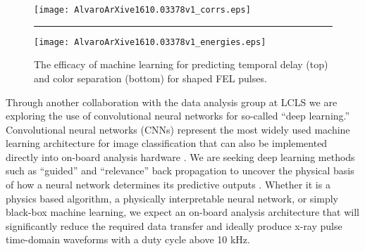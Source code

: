 \begin{wrapfigure}[27]{r}{.5\linewidth}
\vspace{-1\baselineskip}
\centerline{
\texttt{[image: AlvaroArXive1610.03378v1\_corrs.eps]}
}
\hrule
\centerline{
\texttt{[image: AlvaroArXive1610.03378v1\_energies.eps]}
}
\vspace{-2\baselineskip}
\caption{\label{AlvaroIdea} The efficacy of machine learning for predicting temporal delay (top) and color separation (bottom) for shaped FEL pulses. \cite{AlvaroML2016}}
\end{wrapfigure}

Through another collaboration with the data analysis group at LCLS we are exploring the use of convolutional neural networks for so-called ``deep learning.'' %
Convolutional neural networks (CNNs) represent the most widely used machine learning architecture for image classification that can also be implemented directly into on-board analysis hardware \cite{cognimem}.
We are seeking deep learning methods such as ``guided'' and ``relevance'' back propagation to uncover the physical basis of how a neural network determines its predictive outputs \cite{Mihir}.
Whether it is a physics based algorithm, a physically interpretable neural network, or simply black-box machine learning, we expect an on-board analysis architecture that will significantly reduce the required data transfer and ideally produce x-ray pulse time-domain waveforms with a duty cycle above 10 kHz.


